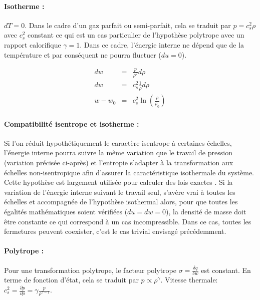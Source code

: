 \paragraph{Isotherme :} $d T = 0$. Dans le cadre d'un gaz parfait ou semi-parfait, cela se traduit par $p = c_s^2 \rho$ avec $c_s^2$ constant ce qui est un cas particulier de l'hypothèse polytrope avec un rapport calorifique $\gamma = 1$. Dans ce cadre, l'énergie interne ne dépend que de la température et par conséquent ne pourra fluctuer ($du = 0$).

\begin{eqnarray}
   dw &=& \frac{p}{\rho^2} d \rho \\
   dw &=& c_s^2 \frac{1}{\rho} d \rho \\
   w - w_0 &=& c_s^2 \ln(\frac{\rho}{\rho_0})
\end{eqnarray}

 \paragraph{Compatibilité isentrope et isotherme :} Si l'on réduit hypothétiquement le caractère isentrope à certaines échelles, l'énergie interne pourra suivre la même variation que le travail de pression (variation précisée ci-après) et l'entropie s'adapter à la transformation aux échelles non-isentropique afin d'assurer la caractéristique isothermale du système. Cette hypothèse est largement utilisée pour calculer des lois exactes \cite{galtier_exact_2011}. Si la variation de l'énergie interne suivant le travail seul, s'avère vrai à toutes les échelles et accompagnée de l'hypothèse isothermal alors, pour que toutes les égalités mathématiques soient vérifiées ($du = dw = 0$), la densité de masse doit être constante  ce qui correspond à un cas incompressible.  Dans ce cas, toutes les fermetures peuvent coexister, c'est le cas trivial envisagé précédemment.
 
\paragraph{Polytrope :} Pour une transformation polytrope, le facteur polytrope $\sigma = \frac{\delta q}{\delta w}$ est constant. En terme de fonction d'état, cela se traduit par $p \propto \rho^{\gamma}$. Vitesse thermale: $c_s^2 = \frac{\partial p}{\partial \rho} = \gamma \frac{p}{\rho^{\gamma -1}} $.

